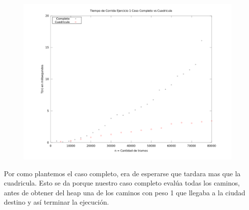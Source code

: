 \begin{figure}[h]
	\centering
	\includegraphics[width=450px]{./figs/completoVScuadricula.png}
\end{figure}

\indent Por como plantemos el caso completo, era de esperarse que tardara mas
que la cuadricula. Esto se da porque nuestro caso completo evalúa todas los
caminos, antes de obtener del heap una de los caminos con peso 1 que llegaba a
la ciudad destino y así terminar la ejecución. 










